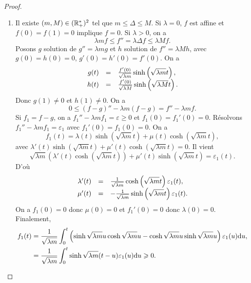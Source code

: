 \documentclass[12pt]{article}
\begin{document}
\begin{proof}
	\phantom{}
	\begin{enumerate}
		\item Il existe $(m,M)\in(\mathbb{R}_{+}^{*})^{2}$ tel que $m\leqslant \Delta\leqslant M$. Si $\lambda=0$, $f$ est affine et $f(0)=f(1)=0$ implique $f=0$. Si $\lambda>0$, on a 
		\begin{equation*}
			\lambda mf\leqslant f''=\lambda\Delta f\leqslant \lambda Mf.
		\end{equation*}
		Posons $g$ solution de $g''=\lambda mg$ et $h$ solution de $f''=\lambda Mh$, avec $g(0)=h(0)=0$, $g'(0)=h'(0)=f'(0)$. On a 
		\begin{equation*}
			\begin{array}[]{rcl}
				g(t) &=& \frac{f'(0)}{\sqrt{\lambda m}}\sinh\left(\sqrt{\lambda m}t\right),\\
				h(t) &=& \frac{f'(0)}{\sqrt{\lambda M}}\sinh\left(\sqrt{\lambda M}t\right).
			\end{array}
		\end{equation*}
		Donc $g(1)\neq0$ et $h(1)\neq0$. On a 
		\begin{equation*}
			0\leqslant (f-g)''-\lambda m(f-g)=f''-\lambda mf.
		\end{equation*}
		Si $f_1=f-g$, on a $f_1''-\lambda m f_1=\varepsilon\geqslant0$ et $f_1(0)=f_1'(0)=0$. Résolvons $f_1''-\lambda mf_1=\varepsilon_{1}$ avec $f_1'(0)=f_1(0)=0$. On a 
		\begin{equation*}
			f_1(t) = \lambda(t)\sinh\left(\sqrt{\lambda m}t\right)+\mu(t)\cosh\left(\sqrt{\lambda m}t\right),
		\end{equation*}
		avec $\lambda'(t)\sinh\left(\sqrt{\lambda m}t\right)+\mu'(t)\cosh\left(\sqrt{\lambda m}t\right)=0$. Il vient 
		\begin{equation*}
			\sqrt{\lambda m}\left(\lambda'(t)\cosh\left(\sqrt{\lambda m}t\right)\right)+\mu'(t)\sinh\left(\sqrt{\lambda m}t\right)=\varepsilon_{1}(t).
		\end{equation*}
		D'où 
		\begin{equation*}
			\begin{array}[]{rcl}
				\lambda'(t) &=& \frac{1}{\sqrt{\lambda m}}\cosh\left(\sqrt{\lambda m}t\right)\varepsilon_{1}(t),\\
				\mu'(t) &=& -\frac{1}{\sqrt{\lambda m}}\sinh\left(\sqrt{\lambda m}t\right)\varepsilon_{1}(t).
			\end{array}
		\end{equation*}
		On a $f_1(0)=0$ donc $\mu(0)=0$ et $f_1'(0)=0$ donc $\lambda(0)=0$. Finalement,
		\begin{align*}
			f_1(t)
			&=\frac{1}{\sqrt{\lambda m}}\int_{0}^{t}\left(\sinh\sqrt{\lambda m}u\cosh\sqrt{\lambda m}u-\cosh\sqrt{\lambda m}u\sinh\sqrt{\lambda m}u\right)\varepsilon_{1}(u)\mathrm{d} u,\\
			&=\frac{1}{\sqrt{\lambda m}}\int_{0}^{t}\sinh\sqrt{\lambda m}(t-u)\varepsilon_{1}(u)\mathrm{d} u\geqslant0.
		\end{align*}


\end{enumerate}
\end{proof}
\end{document}
